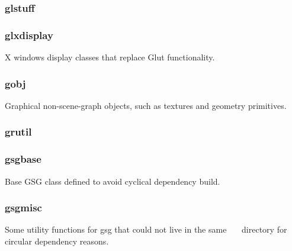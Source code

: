 \documentclass[a4paper]{article}
\begin{document}
\clearpage\subsubsection[glstuff]{glstuff}
\hypertarget{RefHeading21631167907073}{}\subsubsection{}
\clearpage\subsubsection[glxdisplay]{glxdisplay}
\hypertarget{RefHeading21651167907073}{}{\color{black}
X windows display classes that replace Glut functionality.}

\clearpage\subsubsection[gobj]{gobj}
\hypertarget{RefHeading21671167907073}{}{\color{black}
Graphical non-scene-graph objects, such as textures and geometry primitives.}

\clearpage\subsubsection[grutil]{grutil}
\hypertarget{RefHeading21691167907073}{}\subsubsection{}
\clearpage\subsubsection[gsgbase]{gsgbase}
\hypertarget{RefHeading21711167907073}{}{\color{black}
Base GSG class defined to avoid cyclical dependency build.}

\clearpage\subsubsection[gsgmisc]{gsgmisc}
\hypertarget{RefHeading21731167907073}{}{\color{black}
Some utility functions for gsg that could not live in the same\newline
 \ \ \ directory for circular dependency reasons.}
\end{document}
